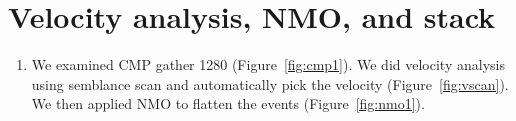 \section{Velocity analysis, NMO, and stack}

\begin{enumerate}

\item We examined CMP gather 1280 (Figure~\ref{fig:cmp1}). We did velocity analysis using semblance scan and automatically pick the velocity (Figure~\ref{fig:vscan}). We then applied NMO to flatten the events (Figure~\ref{fig:nmo1}).   


 
\end{enumerate}





